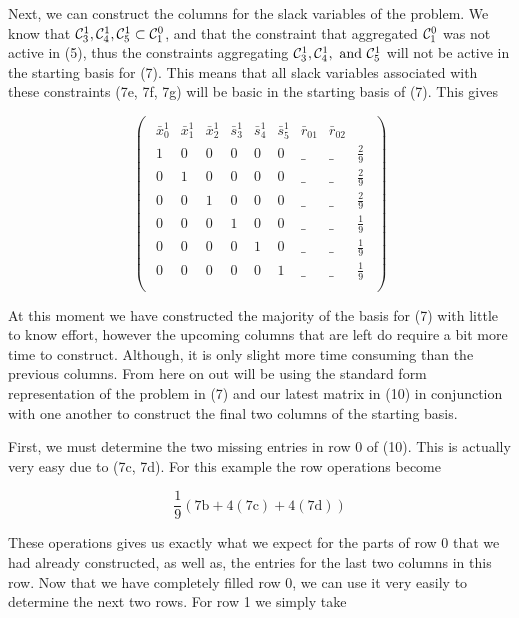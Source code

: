 \documentclass[11pt]{article} %
\newcommand{\cC}{{\cal C}}
\begin{document}
	 Next, we can construct the columns for the slack variables of the problem.  We know that $\cC_3^1, \cC_4^1, \cC_5^1 \subset \cC_1^0$, and that the constraint that aggregated $\cC_1^0$ was not active in (5), thus the constraints aggregating $\cC_3^1, \cC_4^1, \ \text{and} \  \cC_5^1$ will not be active in the starting basis for (7).  This means that all slack variables associated with these constraints (7e, 7f, 7g) will be basic in the starting basis of (7).  This gives
	 
	\begin{equation}
	\begin{pmatrix}
	\begin{array}{cccccc|cc|c}
		\bar{x}^1_0 & \bar{x}^1_1 & \bar{x}^1_2 & \bar{s}^1_3 & \bar{s}^1_4 & \bar{s}^1_5 & \bar{r}_{01} & \bar{r}_{02} \\
	\hline
	1 & 0 & 0 & 0 & 0 & 0 & \_ & \_ & \frac{2}{9} \\ 
	0 & 1 & 0 & 0 & 0 & 0 & \_ & \_ & \frac{2}{9} \\ 
	0 & 0 & 1 & 0 & 0 & 0 & \_ & \_ & \frac{2}{9} \\ 
	0 & 0 & 0 & 1 & 0 & 0 & \_ & \_ & \frac{1}{9} \\ 
	0 & 0 & 0 & 0 & 1 & 0 & \_ & \_ & \frac{1}{9} \\
	0 & 0 & 0 & 0 & 0 & 1 & \_ & \_ & \frac{1}{9} \\
	\end{array}
	\end{pmatrix}
	\end{equation}
	
	At this moment we have constructed the majority of the basis for (7) with little to know effort, however the upcoming columns that are left do require a bit more time to construct.  Although, it is only slight more time consuming than the previous columns.  From here on out will be using the standard form representation of the problem in (7) and our latest matrix in (10) in conjunction with one another to construct the final two columns of the starting basis.	
	
	First, we must determine the two missing entries in row 0 of (10).  This is actually very easy due to (7c, 7d).  For this example the row operations become
	
	\begin{equation}
	\frac{1}{9}(7\text{b} + 4(7\text{c}) + 4(7\text{d}))
	\end{equation}   
	
	These operations gives us exactly what we expect for the parts of row 0 that we had already constructed, as well as, the entries for the last two columns in this row.  Now that we have completely filled row 0, we can use it very easily to determine the next two rows.  For row 1 we simply take
	
\end{document}
